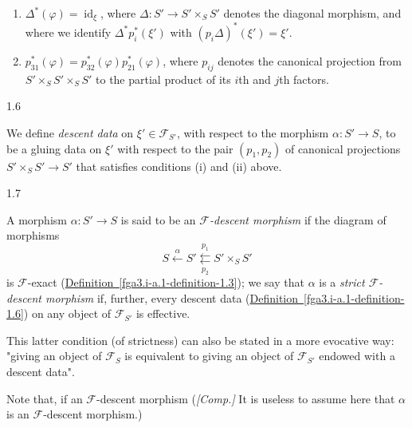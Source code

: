   
 \begin{enumerate}
    
 \item[i.]
      \(\Delta ^*(\varphi ) = \operatorname {id}_\xi \), where \(\Delta \colon  S'\to  S'\times _S S'\) denotes the diagonal morphism, and where we identify \(\Delta ^* p_i^*(\xi ')\) with \((p_i\Delta )^*(\xi ')=\xi '\).
    


    
 \item[ii.]
      \(p_{31}^*(\varphi ) = p_{32}^*(\varphi )p_{21}^*(\varphi )\), where \(p_{ij}\) denotes the canonical projection from \(S'\times _S S'\times _S S'\) to the partial product of its \(i\)th and \(j\)th factors.
    

  \end{enumerate}\begin{definition}{1.6}\label{fga3.i-a.1-definition-1.6}\skipsinglepar\par{}We define \emph{descent data} on \(\xi '\in \mathcal {F}_{S'}\), with respect to the morphism \(\alpha \colon  S'\to  S\), to be a gluing data on \(\xi '\) with respect to the pair \((p_1,p_2)\) of canonical projections \(S'\times _S S'\to  S'\) that satisfies conditions (i) and (ii) above.\end{definition}\begin{definition}{1.7}\label{fga3.i-a.1-definition-1.7}\skipsinglepar\par{}A morphism \(\alpha \colon  S'\to  S\) is said to be an \emph{\(\mathcal {F}\)-descent morphism} if the diagram of morphisms
    \[       S \xleftarrow {\alpha }       S' \overset {p_1}{\underset {p_2}{\leftleftarrows }}       S'\times _S S'     \]
    is \(\mathcal {F}\)-exact (\hyperref[fga3.i-a.1-definition-1.3]{Definition~\ref*{fga3.i-a.1-definition-1.3}});
    we say that \(\alpha \) is a \emph{strict \(\mathcal {F}\)-descent morphism} if, further, every descent data (\hyperref[fga3.i-a.1-definition-1.6]{Definition~\ref*{fga3.i-a.1-definition-1.6}}) on any object of \(\mathcal {F}_{S'}\) is effective.

    This latter condition (of strictness) can also be stated in a more evocative way:
    "giving an object of \(\mathcal {F}_S\) is equivalent to giving an object of \(\mathcal {F}_{S'}\) endowed with a descent data".\end{definition}\par{}Note that, if an \(\mathcal {F}\)-descent morphism
  (\emph{[Comp.]} It is useless to assume here that \(\alpha \) is an \(\mathcal {F}\)-descent morphism.)
